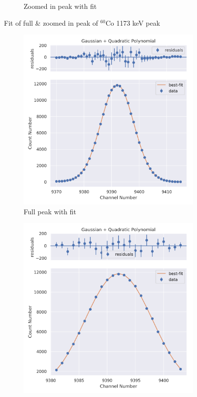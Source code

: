 \documentclass[11pt,a4paper]{article}
\newcommand{\element}[2]{$^{#2}\textrm{#1}$}
\begin{document}
\begin{figure}[H]
\begin{subfigure}{.5\linewidth}
    \caption{Zoomed in peak with fit}
  \end{subfigure}
  \caption{Fit of full \& zoomed in peak of \element{Co}{60} 1173 keV peak}
\end{figure}
\begin{figure}[H]
  \centering
  \begin{subfigure}{.5\linewidth}
    \centering
    \includegraphics[width=\linewidth]{./Images/Cobalt60/Quad/Quad_2_Full.png}
    \caption{Full peak with fit}
  \end{subfigure}%
  \begin{subfigure}{.5\linewidth}
    \centering
    \includegraphics[width=\linewidth]{./Images/Cobalt60/Quad/Quad_2_Zoom.png}

\end{subfigure}
\end{figure}
\end{document}
